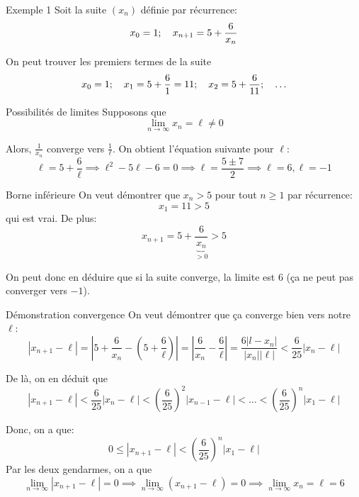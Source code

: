 \documentclass[a4paper]{article}
\begin{document}
\begin{parag}{Exemple 1}
    Soit la suite $\left(x_n\right)$ définie par récurrence:
    \[x_0 = 1; \quad x_{n+1} = 5 + \frac{6}{x_n}\]

    On peut trouver les premiers termes de la suite
    \[x_0 = 1; \quad x_1 = 5 + \frac{6}{1} = 11; \quad x_2 = 5 + \frac{6}{11}; \quad \ldots\]


    \begin{subparag}{Possibilités de limites}
        Supposons que
        \[\lim_{n \to \infty} x_n = \ell \neq 0\]

        Alors, $\frac{1}{x_n}$ converge vers $\frac{1}{\ell}$. On obtient l'équation suivante pour $\ell$:
        \[\ell = 5 + \frac{6}{\ell} \implies \ell^2 - 5\ell - 6 = 0 \implies \ell = \frac{5 \pm 7}{2} \implies \ell = 6, \ell = -1\]
    \end{subparag}


    \begin{subparag}{Borne inférieure}
        On veut démontrer que $x_n > 5$ pour tout $n \geq 1$ par récurrence:
        \[x_1 = 11 > 5\]
        qui est vrai. De plus:
        \[x_{n + 1} = 5 + \frac{6}{\underbrace{x_n}_{>0}} > 5\]

        On peut donc en déduire que si la suite converge, la limite est 6 (ça ne peut pas converger vers $-1$).
    \end{subparag}

    \begin{subparag}{Démonstration convergence}
        On veut démontrer que ça converge bien vers notre $\ell$:
        \[\left|x_{n+1} - \ell\right| = \left|5 + \frac{6}{x_n} - \left(5 + \frac{6}{\ell}\right)\right| = \left|\frac{6}{x_n} - \frac{6}{\ell}\right| = \frac{6\left|l - x_n\right|}{\left|x_n\right|\left|\ell\right|} < \frac{6}{25}\left|x_n - \ell\right|\]

        De là, on en déduit que
        \[\left|x_{n+1} - \ell\right| < \frac{6}{25} \left|x_n - \ell\right| < \left(\frac{6}{25}\right)^2 \left|x_{n-1} - \ell\right| < \ldots < \left(\frac{6}{25}\right)^{n} \left|x_1 - \ell\right|\]

        Donc, on a que:
        \[0 \leq \left|x_{n+1} - \ell\right| < \left(\frac{6}{25}\right)^{n} \left|x_1 - \ell\right|\]
        Par les deux gendarmes, on a que
        \[\lim_{n \to \infty} \left|x_{n+1} - \ell\right| = 0 \implies \lim_{n \to \infty} \left(x_{n+1} - \ell\right) = 0 \implies \lim_{n \to \infty} x_n = \ell = 6\]

    \end{subparag}

\end{parag}
\end{document}
